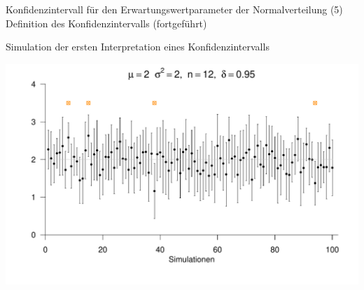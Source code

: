 \documentclass[
  8pt,
  ignorenonframetext,
]{beamer}
\begin{document}
\begin{frame}{Konfidenzintervall für den Erwartungswertparameter der
Normalverteilung}
\protect\hypertarget{konfidenzintervall-fuxfcr-den-erwartungswertparameter-der-normalverteilung-7}{}
\noindent(5) Definition des Konfidenzintervalls (fortgeführt)

\small

Simulation der ersten Interpretation eines Konfidenzintervalls

\vspace{3mm}

\begin{center}\includegraphics[width=0.9\linewidth]{11_Abbildungen/wtfi_11_ki_normal_sigsqr_unbekannt} \end{center}
\end{frame}
\end{document}
